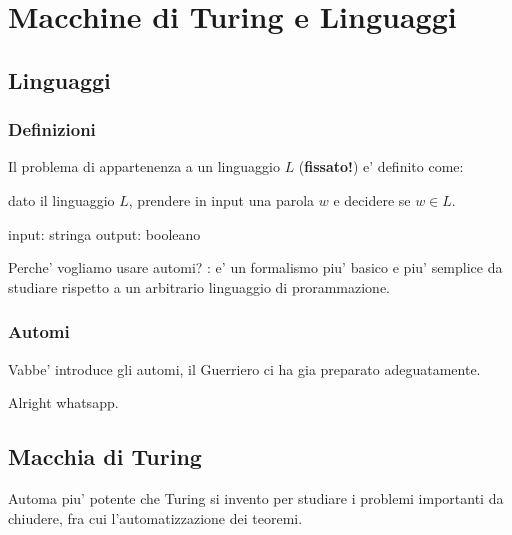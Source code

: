 % 
\chapter{Macchine di Turing e Linguaggi}
\section{Linguaggi}

\subsection{Definizioni}






Il problema di appartenenza a un linguaggio $ L $ (\textbf{fissato!}) e' definito come:

dato il linguaggio $ L $, prendere in input una parola $ w $ e decidere se $ w \in L $.

input: stringa
output: booleano

Perche' vogliamo usare automi? : e' un formalismo piu' basico e piu' semplice da studiare rispetto a un arbitrario linguaggio di prorammazione.

\subsection{Automi}
Vabbe' introduce gli automi, il Guerriero ci ha gia preparato adeguatamente.

Alright whatsapp.

\section{Macchia di Turing}
Automa piu' potente che Turing si invento per studiare i problemi importanti da chiudere, fra cui l'automatizzazione dei teoremi.

